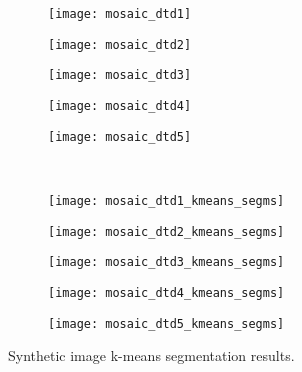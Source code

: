 \begin{figure}[!ht]
    \centering
    \begin{subfigure}[b]{0.19\textwidth}
        \texttt{[image: mosaic\_dtd1]}
    \end{subfigure} 
    \begin{subfigure}[b]{0.19\textwidth}
    	\texttt{[image: mosaic\_dtd2]}
    \end{subfigure}     
    \begin{subfigure}[b]{0.19\textwidth}
        \texttt{[image: mosaic\_dtd3]}
    \end{subfigure}
    \begin{subfigure}[b]{0.19\textwidth}
    	\texttt{[image: mosaic\_dtd4]}
    \end{subfigure}    
    \begin{subfigure}[b]{0.19\textwidth}
        \texttt{[image: mosaic\_dtd5]}
    \end{subfigure} \\ [2ex]
    
    \begin{subfigure}[b]{0.19\textwidth}
    	\texttt{[image: mosaic\_dtd1\_kmeans\_segms]}
        \caption{}
    \end{subfigure}     
    \begin{subfigure}[b]{0.19\textwidth}
        \texttt{[image: mosaic\_dtd2\_kmeans\_segms]}
        \caption{}
    \end{subfigure} 
    \begin{subfigure}[b]{0.19\textwidth}
    	\texttt{[image: mosaic\_dtd3\_kmeans\_segms]}
        \caption{}
    \end{subfigure}     
    \begin{subfigure}[b]{0.19\textwidth}
        \texttt{[image: mosaic\_dtd4\_kmeans\_segms]}
        \caption{}
    \end{subfigure}
    \begin{subfigure}[b]{0.19\textwidth}
    	\texttt{[image: mosaic\_dtd5\_kmeans\_segms]}
        \caption{}
    \end{subfigure} 
        	    
    \caption{Synthetic image k-means segmentation results.}\label{fig:kmeans_segms_dtd_mosaics}    
\end{figure}

